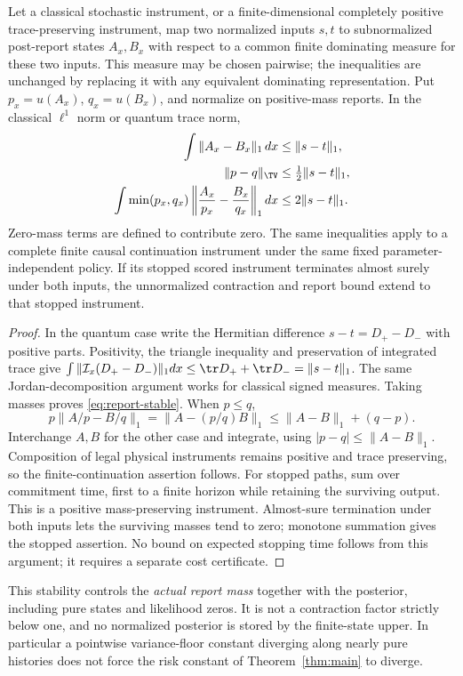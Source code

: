 \begin{proposition}\label{prop:instrument}
Let a classical stochastic instrument, or a finite-dimensional completely positive trace-preserving instrument, map two normalized inputs $s,t$ to subnormalized post-report states $A_x,B_x$ with respect to a common finite dominating measure for these two inputs. This measure may be chosen pairwise; the inequalities are unchanged by replacing it with any equivalent dominating representation. Put $p_x=u(A_x)$, $q_x=u(B_x)$, and normalize on positive-mass reports. In the classical $\ell^1$ norm or quantum trace norm,
\begin{align}
 \int\|A_x-B_x\|_1\,dx&\le\|s-t\|_1,\label{eq:unnorm-stable}\\
 \|p-q\|_{\TV}&\le\tfrac12\|s-t\|_1,\label{eq:report-stable}\\
 \int\min(p_x,q_x)\left\|\frac{A_x}{p_x}-\frac{B_x}{q_x}\right\|_1dx
 &\le2\|s-t\|_1.\label{eq:weighted-stable}
\end{align}
Zero-mass terms are defined to contribute zero. The same inequalities apply to a complete finite causal continuation instrument under the same fixed parameter-independent policy. If its stopped scored instrument terminates almost surely under both inputs, the unnormalized contraction and report bound extend to that stopped instrument.
\end{proposition}
\begin{proof}
In the quantum case write the Hermitian difference $s-t=D_+-D_-$ with positive parts. Positivity, the triangle inequality and preservation of integrated trace give
$\int\|\mathcal I_x(D_+-D_-)\|_1dx\le\tr D_++\tr D_-=\|s-t\|_1$.
The same Jordan-decomposition argument works for classical signed measures. Taking masses proves \eqref{eq:report-stable}. When $p\le q$,
\[
 p\|A/p-B/q\|_1=\|A-(p/q)B\|_1
 \le\|A-B\|_1+(q-p).
\]
Interchange $A,B$ for the other case and integrate, using $|p-q|\le\|A-B\|_1$. Composition of legal physical instruments remains positive and trace preserving, so the finite-continuation assertion follows. For stopped paths, sum over commitment time, first to a finite horizon while retaining the surviving output. This is a positive mass-preserving instrument. Almost-sure termination under both inputs lets the surviving masses tend to zero; monotone summation gives the stopped assertion. No bound on expected stopping time follows from this argument; it requires a separate cost certificate.
\end{proof}

This stability controls the \emph{actual report mass} together with the posterior, including pure states and likelihood zeros. It is not a contraction factor strictly below one, and no normalized posterior is stored by the finite-state upper. In particular a pointwise variance-floor constant diverging along nearly pure histories does not force the risk constant of Theorem~\ref{thm:main} to diverge.

